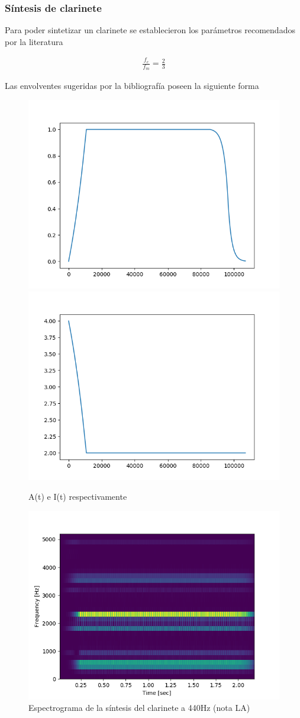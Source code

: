 \documentclass[assd_tp2_main.tex]{subfiles}
\begin{document}
\subsubsection{Síntesis de clarinete}
Para poder sintetizar un clarinete se establecieron los parámetros recomendados por la literatura
 
\begin{eqnarray*}
\displaystyle \frac{f_c}{f_m}=\frac{2}{3}
\end{eqnarray*}

Las envolventes sugeridas por la bibliografía poseen la siguiente forma
\begin{figure}[H]
\centering
\includegraphics[width=0.4\linewidth]{graficos/EJ4/clar_at.png}
\includegraphics[width=0.4\linewidth]{graficos/EJ4/clar_it.png}
\caption{A(t) e I(t) respectivamente}
\label{fig:clarinet_envelopes}
\end{figure}

\begin{figure}[H]
\centering
\includegraphics[width=0.4\linewidth]{graficos/EJ4/ClarinetEspectogram440Hz.png}
\caption{Espectrograma de la síntesis del clarinete a 440Hz (nota LA)}
\label{fig:clarinet_440}
\end{figure}
\end{document}
